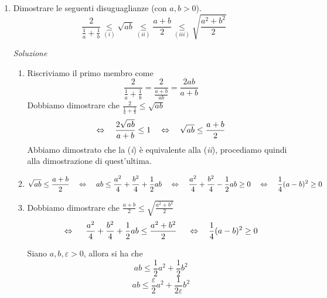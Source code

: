 \documentclass{article}
\begin{document}
\begin{enumerate}[label=\textbf{Esercizio 3.\arabic*.},itemindent=*]
\item Dimostrare le seguenti disuguaglianze (con $a,b>0$).
\[\frac{2}{\frac{1}{a}+\frac{1}{b}}\underset{(i)}{\leq} \sqrt{ab}\underset{(ii)}{\leq}\frac{a+b}{2}\underset{(iii)}{\leq} \sqrt{\frac{a^2+b^2}{2}}\]

\item[\textit{\large Soluzione~}]~
\begin{enumerate}[label=(\textit{\roman*})]
    \item Riscriviamo il primo membro come \[\frac{2}{\frac{1}{a}+\frac{1}{b}}=\frac{2}{\frac{a+b}{ab}}=\frac{2ab}{a+b}\]
    Dobbiamo dimostrare che $\frac{2}{\frac{1}{a}+\frac{1}{b}}\leq \sqrt{ab}$\[\Leftrightarrow ~~~\frac{2\sqrt{ab}}{a+b}\leq 1 ~~~\Leftrightarrow~~~\sqrt{ab}\leq\frac{a+b}{2}\]
    Abbiamo dimostrato che la (\textit{i}) è equivalente alla (\textit{ii}), procediamo quindi alla dimostrazione di quest'ultima.
    \item \[\sqrt{ab}\leq\frac{a+b}{2}~~~\Leftrightarrow~~~ab\leq\frac{a^2}{4}+\frac{b^2}{4}+\frac{1}{2}ab~~~\Leftrightarrow~~~ \frac{a^2}{4}+\frac{b^2}{4}-\frac{1}{2}ab\geq 0~~~\Leftrightarrow~~~\frac{1}{4}(a-b)^2\geq0\] 
    \item Dobbiamo dimostrare che $\frac{a+b}{2}\leq \sqrt{\frac{a^2+b^2}{2}}$
    \[\Harr ~~~ \frac{a^2}{4}+\frac{b^2}{4}+\frac{1}{2}ab\leq \frac{a^2+b^2}{2}~~~~\Harr~~~\frac{1}{4}(a-b)^2\geq 0\]
    \begin{lemma}
        Siano $a,b, \varepsilon>0$, allora si ha che
        \[ab\leq \frac{1}{2}a^2+\frac{1}{2}b^2\]
        \[ab\leq \frac{\varepsilon}{2}a^2+\frac{1}{2\varepsilon}b^2\]
    \end{lemma}
\end{enumerate}
\end{enumerate}
\end{document}
